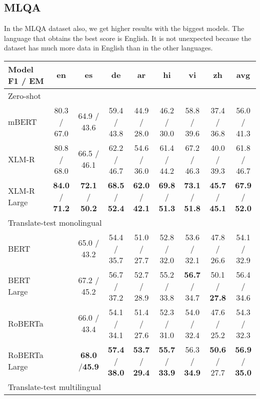\documentclass[11pt]{article}
\begin{document}
\subsection{MLQA}

In the MLQA dataset also, we get higher results with the biggest models. The language that obtains the best score is English. It is not unexpected because the dataset has much more data in English than in the other languages.

\begin{table*}[!ht]
    \centering
    \begin{adjustbox}{max width=\textwidth}
    \begin{tabular}{l|ccccccc|c}
        \toprule
        Model F1 / EM & en & es & de & ar & hi & vi & zh & avg \\
        \midrule
        \multicolumn{9}{l}{Zero-shot} \\
        \midrule
        mBERT & 80.3 / 67.0 & 64.9 / 43.6 & 59.4 / 43.8 & 44.9 / 28.0 & 46.2 / 30.0 & 58.8 / 39.6 & 37.4 / 36.8 & 56.0 / 41.3 \\
        XLM-R & 80.8 / 68.0 & 66.5 / 46.1 & 62.2 / 46.7 & 54.6 / 36.0 & 61.4 / 44.2 & 67.2 / 46.3 & 40.0 / 39.3 & 61.8 / 46.7 \\
        XLM-R Large & \textbf{84.0} / \textbf{71.2} & \textbf{72.1} / \textbf{50.2} & \textbf{68.5} / \textbf{52.4} & \textbf{62.0} / \textbf{42.1} & \textbf{69.8} / \textbf{51.3} & \textbf{73.1} / \textbf{51.8} & \textbf{45.7} / \textbf{45.1} & \textbf{67.9} / \textbf{52.0} \\
        \midrule
        \multicolumn{9}{l}{Translate-test monolingual} \\
        \midrule
        BERT & ~ & 65.0 / 43.2 & 54.4 / 35.7 & 51.0 / 27.7 & 52.8 / 32.0 & 53.6 / 32.1 & 47.8 / 26.6 & 54.1 / 32.9 \\
        BERT Large & ~ & 67.2 / 45.2 & 56.7 / 37.2 & 52.7 / 28.9 & 55.2 / 33.8 & \textbf{56.7} / 34.7 & 50.1 / \textbf{27.8} & 56.4 / 34.6 \\
        RoBERTa & ~ & 66.0 / 43.4 & 54.1 / 34.1 & 51.4 / 27.6 & 52.3 / 31.0 & 54.0 / 32.4 & 47.6 / 25.2 & 54.3 / 32.3 \\
        RoBERTa Large & ~ &\textbf{68.0} /\textbf{45.9} & \textbf{57.4} / \textbf{38.0} & \textbf{53.7} / \textbf{29.4} & \textbf{55.7} / \textbf{33.9} & 56.3 / \textbf{34.9} & \textbf{50.6} / 27.7 & \textbf{56.9} / \textbf{35.0}\\
        \midrule
        \multicolumn{9}{l}{Translate-test multilingual} \\

\end{tabular}
\end{adjustbox}
\end{table*}
\end{document}

